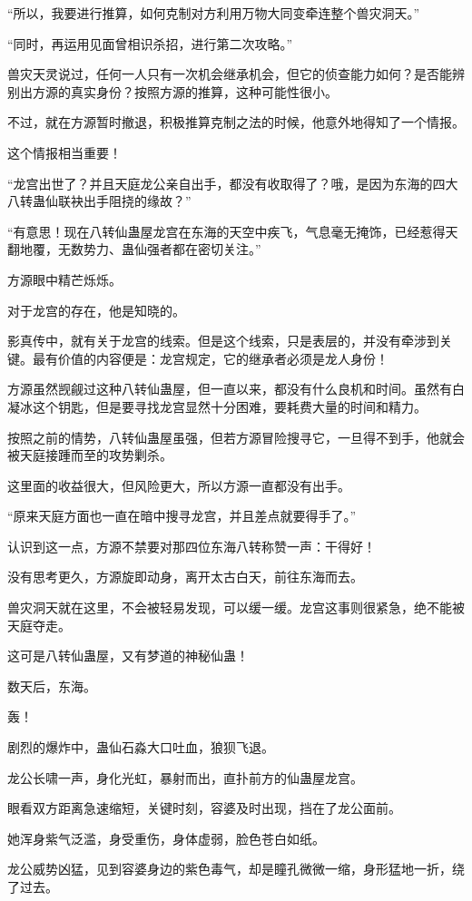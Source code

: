 \begin{this_body}
“所以，我要进行推算，如何克制对方利用万物大同变牵连整个兽灾洞天。”

“同时，再运用见面曾相识杀招，进行第二次攻略。”

兽灾天灵说过，任何一人只有一次机会继承机会，但它的侦查能力如何？是否能辨别出方源的真实身份？按照方源的推算，这种可能性很小。

不过，就在方源暂时撤退，积极推算克制之法的时候，他意外地得知了一个情报。

这个情报相当重要！

“龙宫出世了？并且天庭龙公亲自出手，都没有收取得了？哦，是因为东海的四大八转蛊仙联袂出手阻挠的缘故？”

“有意思！现在八转仙蛊屋龙宫在东海的天空中疾飞，气息毫无掩饰，已经惹得天翻地覆，无数势力、蛊仙强者都在密切关注。”

方源眼中精芒烁烁。

对于龙宫的存在，他是知晓的。

影真传中，就有关于龙宫的线索。但是这个线索，只是表层的，并没有牵涉到关键。最有价值的内容便是：龙宫规定，它的继承者必须是龙人身份！

方源虽然觊觎过这种八转仙蛊屋，但一直以来，都没有什么良机和时间。虽然有白凝冰这个钥匙，但是要寻找龙宫显然十分困难，要耗费大量的时间和精力。

按照之前的情势，八转仙蛊屋虽强，但若方源冒险搜寻它，一旦得不到手，他就会被天庭接踵而至的攻势剿杀。

这里面的收益很大，但风险更大，所以方源一直都没有出手。

“原来天庭方面也一直在暗中搜寻龙宫，并且差点就要得手了。”

认识到这一点，方源不禁要对那四位东海八转称赞一声：干得好！

没有思考更久，方源旋即动身，离开太古白天，前往东海而去。

兽灾洞天就在这里，不会被轻易发现，可以缓一缓。龙宫这事则很紧急，绝不能被天庭夺走。

这可是八转仙蛊屋，又有梦道的神秘仙蛊！

数天后，东海。

轰！

剧烈的爆炸中，蛊仙石淼大口吐血，狼狈飞退。

龙公长啸一声，身化光虹，暴射而出，直扑前方的仙蛊屋龙宫。

眼看双方距离急速缩短，关键时刻，容婆及时出现，挡在了龙公面前。

她浑身紫气泛滥，身受重伤，身体虚弱，脸色苍白如纸。

龙公威势凶猛，见到容婆身边的紫色毒气，却是瞳孔微微一缩，身形猛地一折，绕了过去。


\end{this_body}
